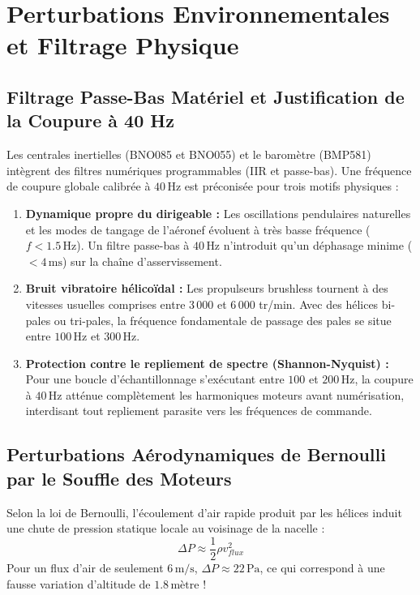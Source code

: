 \documentclass[../Implementation.tex]{subfiles}
\begin{document}
\section{Perturbations Environnementales et Filtrage Physique}

\subsection{Filtrage Passe-Bas Matériel et Justification de la Coupure à 40 Hz}

Les centrales inertielles (BNO085 et BNO055) et le baromètre (BMP581) intègrent des filtres numériques programmables (IIR et passe-bas). Une fréquence de coupure globale calibrée à \textbf{$40\,\text{Hz}$} est préconisée pour trois motifs physiques :
\begin{enumerate}
    \item \textbf{Dynamique propre du dirigeable :} Les oscillations pendulaires naturelles et les modes de tangage de l'aéronef évoluent à très basse fréquence ($f < 1.5\,\text{Hz}$). Un filtre passe-bas à $40\,\text{Hz}$ n'introduit qu'un déphasage minime ($< 4\,\text{ms}$) sur la chaîne d'asservissement.
    \item \textbf{Bruit vibratoire hélicoïdal :} Les propulseurs brushless tournent à des vitesses usuelles comprises entre 3\,000 et 6\,000 tr/min. Avec des hélices bi-pales ou tri-pales, la fréquence fondamentale de passage des pales se situe entre $100\,\text{Hz}$ et $300\,\text{Hz}$.
    \item \textbf{Protection contre le repliement de spectre (Shannon-Nyquist) :} Pour une boucle d'échantillonnage s'exécutant entre $100$ et $200\,\text{Hz}$, la coupure à $40\,\text{Hz}$ atténue complètement les harmoniques moteurs avant numérisation, interdisant tout repliement parasite vers les fréquences de commande.
\end{enumerate}

\subsection{Perturbations Aérodynamiques de Bernoulli par le Souffle des Moteurs}

Selon la loi de Bernoulli, l'écoulement d'air rapide produit par les hélices induit une chute de pression statique locale au voisinage de la nacelle :
\begin{equation}
    \Delta P \approx \frac{1}{2} \rho v_{flux}^2
\end{equation}
Pour un flux d'air de seulement $6\,\text{m/s}$, $\Delta P \approx 22\,\text{Pa}$, ce qui correspond à une fausse variation d'altitude de \textbf{$1.8\,\text{mètre}$} !
\end{document}
